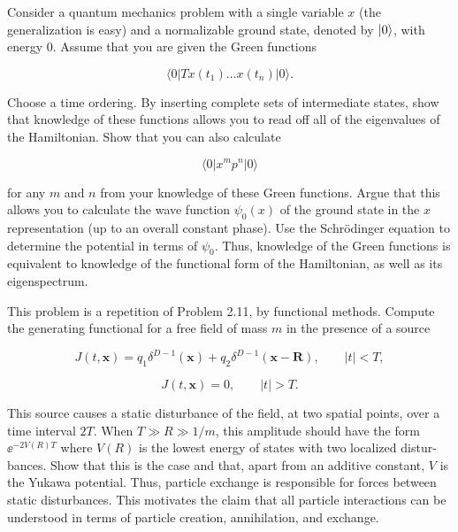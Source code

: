 \begin{banksproblems}

Consider a quantum mechanics problem with a single variable $x$ (the generalization is easy)
and a normalizable ground state, denoted by $\lvert 0\rangle$, with energy 0. Assume that you are given
the Green functions

\begin{equation}
\langle0|T x(t_1)\ldots x(t_n)|0\rangle.
\label{eq:3.44}
\end{equation}

Choose a time ordering. By inserting complete sets of intermediate states, show
that knowledge of these functions allows you to read off all of the eigenvalues of
the Hamiltonian. Show that you can also calculate

\[
\langle0|x^m p^n|0\rangle
\]

for any $m$ and $n$ from your knowledge of these Green functions. Argue that this
allows you to calculate the wave function $\psi_0(x)$ of the ground state in the $x$
representation (up to an overall constant phase). Use the Schrödinger equation
to determine the potential in terms of $\psi_0$. Thus, knowledge of the Green functions
is equivalent to knowledge of the functional form of the Hamiltonian, as well as
its eigenspectrum.

This problem is a repetition of Problem 2.11, by functional methods. Compute the
generating functional for a free field of mass $m$ in the presence of a source

\[
J(t,\mathbf x)=q_1\delta^{D-1}(\mathbf x)+q_2\delta^{D-1}(\mathbf x-\mathbf R),\qquad |t|<T,
\]

\[
J(t,\mathbf x)=0,\qquad |t|>T.
\]

This source causes a static disturbance of the field, at two spatial points, over a
time interval $2T$. When $T\gg R\gg1/m$, this amplitude should have the form
$\ee^{-2V(R)T}$ where $V(R)$ is the lowest energy of states with two localized distur-
bances. Show that this is the case and that, apart from an additive constant, $V$ is
the Yukawa potential. Thus, particle exchange is responsible for forces between
static disturbances. This motivates the claim that all particle interactions can be
understood in terms of particle creation, annihilation, and exchange.


\end{banksproblems}
